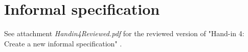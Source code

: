 \documentclass[Main]{subfiles}
\begin{document}
\section{Informal specification}

See attachment \textit{Handin4Reviewed.pdf} for the reviewed version of "Hand-in 4: Create a new informal specification" \parencite[]{HI4}.
\end{document}
